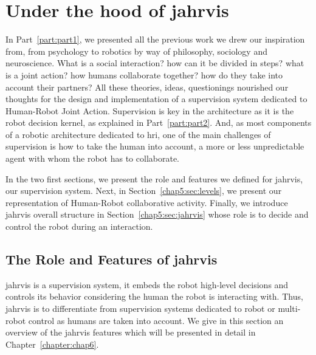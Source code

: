 \documentclass[a4paper,11pt,twoside]{StyleThese}
\begin{document}
	\setcounter{chapter}{4} %
	\dominitoc
	\faketableofcontents
	\fi

\chapter{Under the hood of \acrshort{jahrvis}}
\label{chapter:chap5}
\minitoc

In Part~\ref{part:part1}, we presented all the previous work we drew our inspiration from, from psychology to robotics by way of philosophy, sociology and neuroscience. What is a social interaction? how can it be divided in steps? what is a joint action? how humans collaborate together? how do they take into account their partners?   All these theories, ideas, questionings nourished our thoughts for the design and implementation of a supervision system dedicated to Human-Robot Joint Action. Supervision is key in the architecture as it is the robot decision kernel, as explained in Part~\ref{part:part2}. And, as most components of a robotic architecture dedicated to \acrshort{hri}, one of the main challenges of supervision is how to take the human into account, a more or less unpredictable agent with whom the robot has to collaborate. 

In the two first sections, we present the role and features we defined for \acrfull{jahrvis}, our supervision system. Next, in Section~\ref{chap5:sec:levels}, we present our representation of Human-Robot collaborative activity. Finally, we introduce \acrshort{jahrvis} overall structure in Section~\ref{chap5:sec:jahrvis} whose role is to decide and control the robot during an interaction.

\section{The Role and Features of \acrshort{jahrvis}}\label{chap5:sec:sup_features}

\acrshort{jahrvis} is a supervision system, \ie it embeds the robot high-level decisions and controls its behavior considering the human the robot is interacting with. Thus, \acrshort{jahrvis} is to differentiate from supervision systems dedicated to robot or multi-robot control as humans are taken into account. We give in this section an overview of the \acrshort{jahrvis} features which will be presented in detail in Chapter~\ref{chapter:chap6}.
\end{document}
